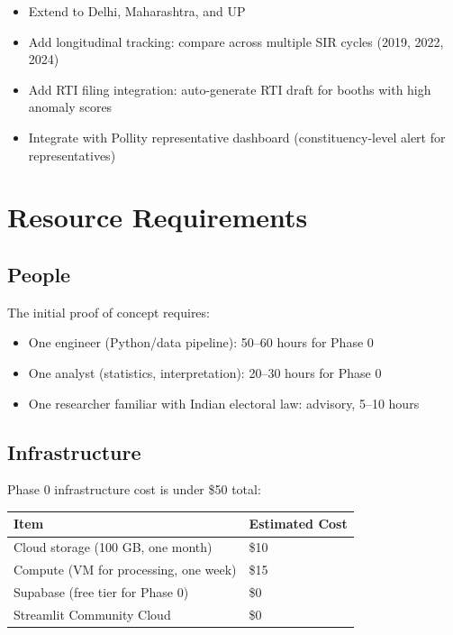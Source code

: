 \documentclass[11pt, a4paper]{article}
\begin{document}
\begin{itemize}[leftmargin=1.5em, itemsep=3pt]
  \item[$\rightarrow$] Extend to Delhi, Maharashtra, and UP
  \item[$\rightarrow$] Add longitudinal tracking: compare across multiple SIR cycles (2019, 2022, 2024)
  \item[$\rightarrow$] Add RTI filing integration: auto-generate RTI draft for booths with high anomaly scores
  \item[$\rightarrow$] Integrate with Pollity representative dashboard (constituency-level alert for representatives)
\end{itemize}

\section{Resource Requirements}

\subsection{People}

The initial proof of concept requires:

\begin{itemize}[leftmargin=1.5em, itemsep=3pt]
  \item One engineer (Python/data pipeline): 50--60 hours for Phase 0
  \item One analyst (statistics, interpretation): 20--30 hours for Phase 0
  \item One researcher familiar with Indian electoral law: advisory, 5--10 hours
\end{itemize}

\subsection{Infrastructure}

Phase 0 infrastructure cost is under \$50 total:

\begin{tabularx}{\linewidth}{lX}
\toprule
\textbf{Item} & \textbf{Estimated Cost} \\
\midrule
Cloud storage (100 GB, one month) & \$10 \\
Compute (VM for processing, one week) & \$15 \\
Supabase (free tier for Phase 0) & \$0 \\
Streamlit Community Cloud & \$0 \\
\bottomrule
\end{tabularx}
\end{document}
